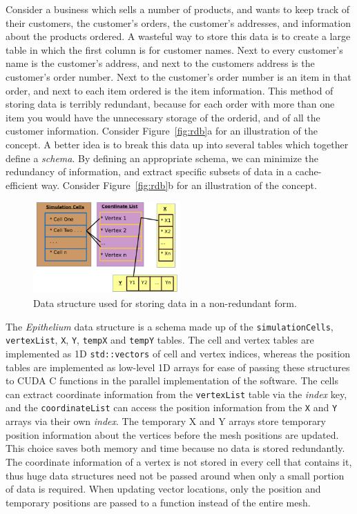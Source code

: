 Consider a business which sells a number of products, and wants to keep 
track of their customers, the customer's orders, the customer's 
addresses, and information about the products ordered. A wasteful way 
to store this data is to create a large table in which the first column 
is for customer names. Next to every customer's name is the customer's 
address, and next to the customers address is the customer's order 
number. Next to the customer's order number is an item in that order, 
and next to each item ordered is the item information. This method of 
storing data is terribly redundant, because for each order with more 
than one item you would have the unnecessary storage of the orderid, and of all 
the customer information. Consider Figure~\ref{fig:rdb}a for an illustration of the concept.
A better idea is to break this data up into several tables which 
together define a \emph{schema}. By defining an appropriate schema, we can minimize the redundancy of information, and extract specific subsets of data in a cache-efficient way. Consider Figure~\ref{fig:rdb}b for an illustration of the concept.

\begin{figure}[ht]
\centering
\includegraphics[width=0.5\textwidth]{../diagrams/ds.png}
\caption{Data structure used for storing data in a non-redundant form.}
\end{figure}

The \emph{Epithelium} data structure is a schema made up of the \texttt{simulationCells}, \texttt{vertexList}, \texttt{X}, \texttt{Y}, \texttt{tempX} and \texttt{tempY} tables. The cell and vertex tables are implemented as 1D \texttt{std::vectors} of cell and vertex indices, whereas the position tables are implemented as low-level 1D arrays for ease of passing these structures to CUDA C functions in the parallel implementation of the software. The cells can extract coordinate information from the \texttt{vertexList} table via the \emph{index} key, and the \texttt{coordinateList} can access the position information from the \texttt{X} and \texttt{Y} arrays via their own \emph{index}. The temporary X and Y arrays store temporary position information about the vertices before the mesh positions are updated. This choice saves both memory and time because no data is stored redundantly. The coordinate information of a vertex is not stored in every cell that contains it, thus huge data structures need not be passed around when only a small portion of data is required. When updating vector locations, only the position and temporary positions are passed to a function instead of the entire mesh. 

